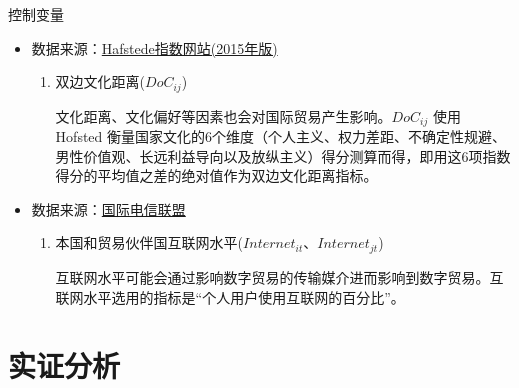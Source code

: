 \documentclass{beamer}
\begin{document}
\begin{frame}{控制变量}
    \begin{itemize}
        \item 数据来源：\underline{Hafstede指数网站(2015年版)}
        \begin{enumerate}
            \item 双边文化距离($DoC_{ij}$) \\
            \begin{scriptsize}
                文化距离、文化偏好等因素也会对国际贸易产生影响。$DoC_{ij}$ 使用 Hofsted 衡量国家文化的6个维度（个人主义、权力差距、不确定性规避、男性价值观、长远利益导向以及放纵主义）得分测算而得，即用这6项指数得分的平均值之差的绝对值作为双边文化距离指标。
            \end{scriptsize}
        \end{enumerate}
        \item 数据来源：\underline{国际电信联盟}
        \begin{enumerate}
            \item 本国和贸易伙伴国互联网水平($Internet_{it}\text{、} Internet_{jt}$) \\
            \begin{scriptsize}
                互联网水平可能会通过影响数字贸易的传输媒介进而影响到数字贸易。互联网水平选用的指标是“个人用户使用互联网的百分比”。
            \end{scriptsize}
        \end{enumerate}
    \end{itemize}
\end{frame}

\section{实证分析}
\end{document}
